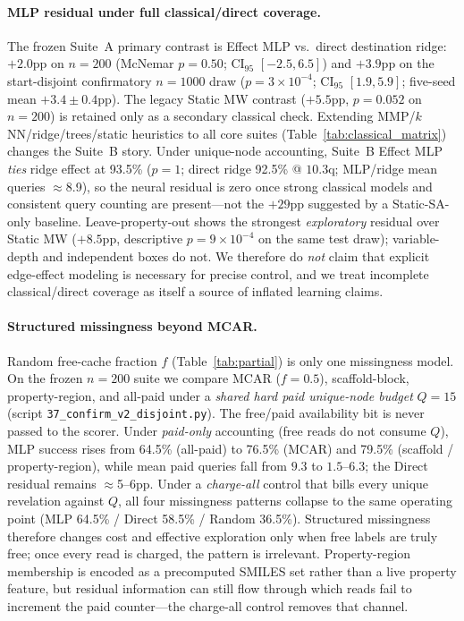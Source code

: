 \paragraph{MLP residual under full classical/direct coverage.}
The frozen Suite~A primary contrast is Effect MLP vs.\ direct destination ridge: $+2.0$pp on $n{=}200$ (McNemar $p{=}0.50$; CI$_{95}$ $[-2.5,6.5]$) and $+3.9$pp on the start-disjoint confirmatory $n{=}1000$ draw ($p{=}3\times10^{-4}$; CI$_{95}$ $[1.9,5.9]$; five-seed mean $+3.4\pm0.4$pp). The legacy Static MW contrast ($+5.5$pp, $p{=}0.052$ on $n{=}200$) is retained only as a secondary classical check. Extending MMP/$k$NN/ridge/trees/static heuristics to all core suites (Table~\ref{tab:classical_matrix}) changes the Suite~B story. Under unique-node accounting, Suite~B Effect MLP \emph{ties} ridge effect at 93.5\% ($p{=}1$; direct ridge 92.5\% @ $10.3$q; MLP/ridge mean queries $\approx$8.9), so the neural residual is zero once strong classical models and consistent query counting are present---not the $+29$pp suggested by a Static-SA-only baseline. Leave-property-out shows the strongest \emph{exploratory} residual over Static MW ($+8.5$pp, descriptive $p{=}9\times10^{-4}$ on the same test draw); variable-depth and independent boxes do not. We therefore do \emph{not} claim that explicit edge-effect modeling is necessary for precise control, and we treat incomplete classical/direct coverage as itself a source of inflated learning claims.

\paragraph{Structured missingness beyond MCAR.}
Random free-cache fraction $f$ (Table~\ref{tab:partial}) is only one missingness model. On the frozen $n{=}200$ suite we compare MCAR ($f{=}0.5$), scaffold-block, property-region, and all-paid under a \emph{shared hard paid unique-node budget} $Q{=}15$ (script \texttt{37\_confirm\_v2\_disjoint.py}). The free/paid availability bit is never passed to the scorer. Under \emph{paid-only} accounting (free reads do not consume $Q$), MLP success rises from 64.5\% (all-paid) to 76.5\% (MCAR) and 79.5\% (scaffold / property-region), while mean paid queries fall from $9.3$ to $1.5$--$6.3$; the Direct residual remains $\approx$5--6pp. Under a \emph{charge-all} control that bills every unique revelation against $Q$, all four missingness patterns collapse to the same operating point (MLP 64.5\% / Direct 58.5\% / Random 36.5\%). Structured missingness therefore changes cost and effective exploration only when free labels are truly free; once every read is charged, the pattern is irrelevant. Property-region membership is encoded as a precomputed SMILES set rather than a live property feature, but residual information can still flow through which reads fail to increment the paid counter---the charge-all control removes that channel.

